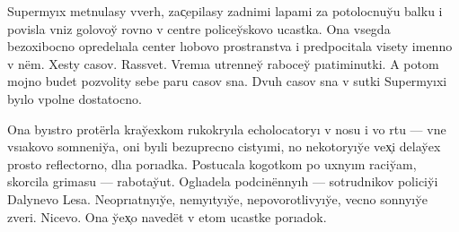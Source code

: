 \documentclass[12pt]{book}
\begin{document}
\setlength{\baselineskip}{1.5em}
\newcommand{\e}{ë}

\newcommand{\yi}{yı}

\newcommand{\ia}{ıa}

\newcommand{\iu}{ıo}

\newcommand{\y}{y̆}
\newcommand{\yf}{y̆}

\newcommand{\Y}{Y̆}

\newcommand{\X}{X̹}
\newcommand{\x}{x̹}
\newcommand{\C}{C̹}
\renewcommand{\c}{c̹}

%
% 
%
% 
% 
% 
Superm{\yi}x metnulasy vverh, za{\c}epilasy zadnimi lapami za potolocnu{\y}u balku i povisla vniz golovo{\y} rovno v centre police{\y}skovo ucastka. Ona vsegda bez\-oxi\-boc\-no opredel{\ia}la center l{\iu}bovo prostranstva i predpocitala visety imenno v n{\e}m. Xesty casov. Rassvet. Vrem{\ia} utrenne{\y} raboce{\y} p{\ia}timinutki. A potom mojno budet pozvolity sebe paru casov sna. Dvuh casov sna v sutki Superm{\yi}xi b{\yi}lo vpolne dostatocno.

Ona b{\yi}stro prot{\e}rla kra{\y}exkom rukokr{\yi}la echolocator{\yi} v nosu i vo rtu — vne vs{\ia}kovo somneni{\y}a, oni b{\yi}li bezuprecno cist{\yi}mi, no nekotor{\yi}{\y}e ve{\x}i dela{\y}ex prosto reflectorno, dl{\ia} por{\ia}dka. Postucala kogotkom po uxn{\yi}m raci{\y}am, skorcila grimasu — rabota{\y}ut. Ogl{\ia}dela podcin{\e}nn{\yi}h — sotrudnikov polici{\y}i Dalynevo Lesa. Neopr{\ia}tn{\yi}{\y}e, nem{\yi}t{\yi}{\y}e, nepovorotliv{\yi}{\y}e, vecno sonn{\yi}{\y}e zveri. Nicevo. Ona {\y}e{\x}o naved{\e}t v etom ucastke por{\ia}dok.
\end{document}
